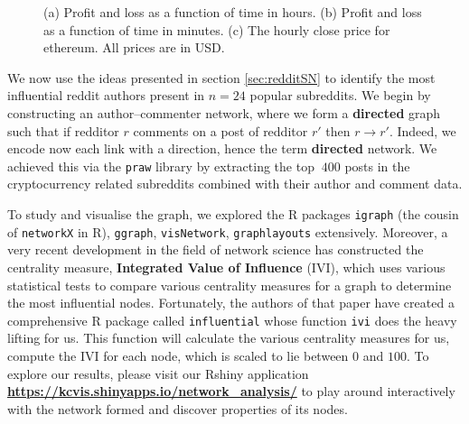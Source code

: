 \documentclass[twoside]{report}
\newcommand{\code}{\texttt}
\begin{document}
\begin{spacing}{1}
\begin{figure}[h]
\caption{(a) Profit and loss as a function of time in hours. (b) Profit and loss as a function of time in minutes. (c) The hourly close price for ethereum. All prices are in USD.}
\label{fig:pnl_naji102}
\end{figure}
We now use the ideas presented in section \ref{sec:redditSN} to identify the most influential reddit authors present in $n=24$ popular subreddits. We begin by constructing an author--commenter network, where we form a \textbf{directed} graph such that if redditor $r$ comments on a post of redditor $r'$ then $r \rightarrow r'$. Indeed, we encode now each link with a direction, hence the term \textbf{directed} network. We achieved this via the \code{praw} library by extracting the top $~400$ posts in the cryptocurrency related subreddits combined with their author and comment data. 



To study and visualise the graph, we explored the R packages \code{igraph} (the cousin of \code{networkX} in R), \code{ggraph}, \code{visNetwork}, \code{graphlayouts} extensively. Moreover, a very recent development in the field of network science has constructed the centrality measure, \textbf{Integrated Value of Influence} (IVI), which uses various statistical tests to compare various centrality measures for a graph to determine the most influential nodes. Fortunately, the authors of that paper have created a comprehensive R package called \code{influential} whose function \code{ivi} does the heavy lifting for us. This function will calculate the various centrality measures for us, compute the IVI for each node, which is scaled to lie between $0$ and $100$. To explore our results, please visit our Rshiny application \textbf{\url{https://kcvis.shinyapps.io/network_analysis/}} to play around interactively with the network formed and discover properties of its nodes. 




\end{spacing}
\end{document}
